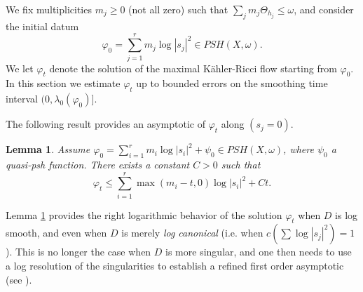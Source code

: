 \documentclass[10pt,a4paper]{amsart}
\numberwithin{equation}{section}
\newtheorem{lem}[theorem]{Lemma}
\newcommand{\f}{\varphi}
\newcommand{\p}{\psi}
\newcommand \la {\lambda}
\begin{document}
We fix multiplicities $m_j\geq 0$ (not all zero) such that $\sum_j m_j \Theta_{h_j} \leq \omega$, and consider 
the initial datum
 $$
\f_0= \sum_{j=1}^r m_j \log |s_j|^2 \in PSH(X,\omega).
$$
We let $\f_t$ denote the solution of the maximal K\"ahler-Ricci flow starting from $\f_0$. 
In this section we estimate $\f_t$ up to bounded errors on the smoothing time interval $(0,\la_0(\f_0)]$.

\smallskip

  
The following result provides an asymptotic of $\f_t$ along  $(s_j=0)$.
 

\begin{lem} \label{lem:log}
Assume $\f_0= \sum_{i=1}^r m_i \log |s_i|^2+\p_0 \in PSH(X,\omega)$, where 
$\p_0$ a quasi-psh function.
There exists a constant $C>0$ such that  
	\[
	\varphi_t \leq  \sum_{i=1}^r \max(m_i- t,0) \log |s_i|^2 +Ct.
	\]
\end{lem}


Lemma \ref{lem:log} provides the right logarithmic behavior of 
the solution $\f_t$ when $D$ is
log smooth, and even when $D$ is merely 
{\it log canonical} (i.e. when  $c(\sum \log |s_j|^2)=1$).
This is no longer the case when $D$ is more singular, and one then needs to  use a log resolution
of the singularities to establish a refined first order asymptotic
(see \cite{DGL26}).
\end{document}
